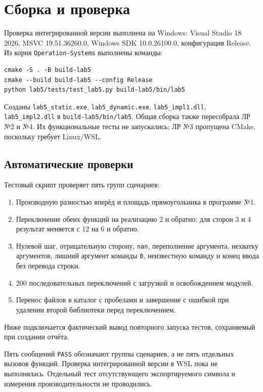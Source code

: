 \section{Сборка и проверка}
Проверка интегрированной версии выполнена на Windows: Visual Studio 18 2026, MSVC 19.51.36260.0, Windows SDK 10.0.26100.0, конфигурация Release. Из корня \texttt{Operation-Systems} выполнены команды:
\begin{verbatim}
cmake -S . -B build-lab5
cmake --build build-lab5 --config Release
python lab5/tests/test_lab5.py build-lab5/bin/lab5
\end{verbatim}
Созданы \texttt{lab5\_static.exe}, \texttt{lab5\_dynamic.exe}, \texttt{lab5\_impl1.dll}, \texttt{lab5\_impl2.dll} в \texttt{build-lab5/bin/lab5}. Общая сборка также пересобрала ЛР №2 и №4. Их функциональные тесты не запускались; ЛР №3 пропущена CMake, поскольку требует Linux/WSL.

\subsection{Автоматические проверки}
Тестовый скрипт проверяет пять групп сценариев:
\begin{enumerate}
\item Производную разностью вперёд и площадь прямоугольника в программе №1.
\item Переключение обеих функций на реализацию 2 и обратно: для сторон 3 и 4 результат меняется с 12 на 6 и обратно.
\item Нулевой шаг, отрицательную сторону, \texttt{nan}, переполнение аргумента, нехватку аргументов, лишний аргумент команды \texttt{0}, неизвестную команду и конец ввода без перевода строки.
\item 200 последовательных переключений с загрузкой и освобождением модулей.
\item Перенос файлов в каталог с пробелами и завершение с ошибкой при удалении второй библиотеки перед переключением.
\end{enumerate}
Ниже подключается фактический вывод повторного запуска тестов, сохраняемый при создании отчёта.


Пять сообщений \texttt{PASS} обозначают группы сценариев, а не пять отдельных вызовов функций. Проверка интегрированной версии в WSL пока не выполнялась. Отдельный тест отсутствующего экспортируемого символа и измерения производительности не проводились.

